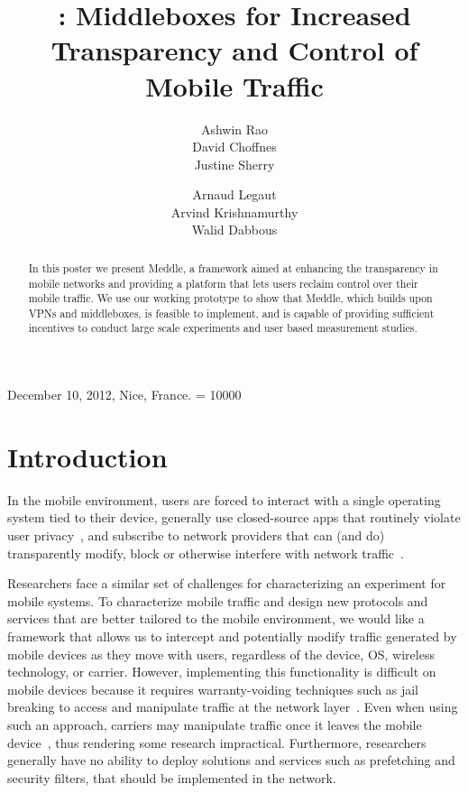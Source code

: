 \documentclass{sig-alternate}
\title{\meddle: Middleboxes for Increased Transparency and Control of
  Mobile Traffic\vspace{-0.2in}}
\author{
\alignauthor
Ashwin Rao\\
\affaddr{INRIA}
\alignauthor        
David Choffnes\\
\affaddr{University of Washington}
\alignauthor
Justine Sherry\\
\affaddr{UC Berkeley}
\and
\alignauthor
Arnaud Legaut\\
\affaddr{INRIA}
\alignauthor 
Arvind Krishnamurthy\\
\affaddr{University of Washington}
\alignauthor
Walid Dabbous\\
\affaddr{INRIA}
}
\newcommand{\meddle}{{Meddle}\xspace}
\begin{document}
	
 {December 10, 2012, Nice, France.}
\widowpenalty = 10000

\maketitle

\begin{abstract}
In this poster we present \meddle, a framework aimed at enhancing
the transparency in mobile networks and providing a platform that lets
users reclaim control over their mobile traffic. We use our working
prototype to show that \meddle, which builds upon VPNs and
middleboxes, is feasible to implement, and is capable of providing
sufficient incentives to conduct large scale experiments and user
based measurement studies.
\end{abstract}

\section{Introduction}

In the mobile environment, users are forced to interact with a single
operating system tied to their device, generally use closed-source
apps that routinely violate user privacy~\cite{hornyack:appfence}, and
subscribe to network providers that can (and do) transparently modify,
block or otherwise interfere with network
traffic~\cite{wang:middleboxes}.  

Researchers face a similar set of challenges for characterizing an
experiment for mobile systems. To characterize mobile traffic and
design new protocols and services that are better tailored to the
mobile environment, we would like a framework that allows us to
intercept and potentially modify traffic generated by mobile devices
as they move with users, regardless of the device, OS, wireless
technology, or carrier. However, implementing this functionality is
difficult on mobile devices because it requires warranty-voiding
techniques such as jail breaking to access and manipulate traffic at
the network layer~\cite{enck:taintdroid}. Even when using such an
approach, carriers may manipulate traffic once it leaves the mobile
device~\cite{wang:middleboxes}, thus rendering some research
impractical. Furthermore, researchers generally have no ability to 
deploy solutions and services such as prefetching and security
filters, that should be implemented in the network.
\end{document}
